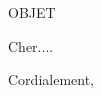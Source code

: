 \documentclass[12pt]{letter}
\date{Le Mans, DATE}
\begin{document}
	\begin{letter}{OBJET}
	\opening{Cher....}



\closing{Cordialement,}
\end{letter}
\end{document}
